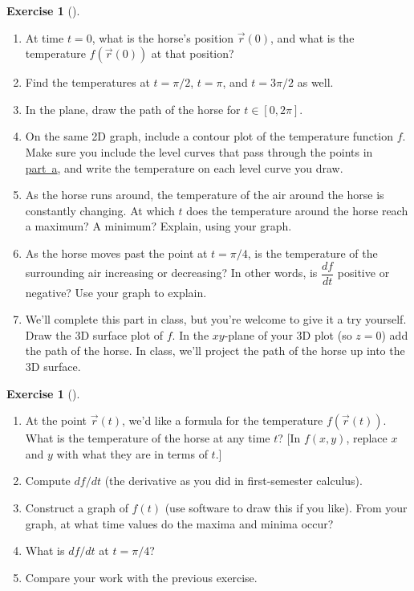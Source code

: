 \documentclass[10pt,]{book}
\theoremstyle{plain}
\theoremstyle{definition}
\theoremstyle{definition}
\theoremstyle{definition}
\theoremstyle{definition}
\newtheorem{exploration}[project]{Exercise}
\theoremstyle{definition}
\numberwithin{equation}{section}
\begin{document}
\begin{exploration}[]\label{prob_horse_track_chain}
\leavevmode%
\begin{enumerate}[font=\bfseries,label=(\alph*),ref=\alph*]
\item\label{item_1} At time \(t=0\), what is the horse's position \(\vec r(0)\), and what is the temperature \(f(\vec r(0))\) at that position?%
\item\label{task-342} Find the temperatures at \(t=\pi/2\), \(t=\pi\), and \(t=3\pi/2\) as well.%
\item\label{task-343} In the plane, draw the path of the horse for \(t\in [0,2\pi]\).%
\item\label{task-344} On the same 2D graph, include a contour plot of the temperature function \(f\). Make sure you include the level curves that pass through the points in \hyperref[item_1]{part~a}, and write the temperature on each level curve you draw. %
\item\label{task-345} As the horse runs around, the temperature of the air around the horse is constantly changing. At which \(t\) does the temperature around the horse reach a maximum?  A minimum?  Explain, using your graph. %
\item\label{item_2} As the horse moves past the point at \(t=\pi/4\), is the temperature of the surrounding air increasing or decreasing? In other words, is \(\dfrac{df}{dt}\) positive or negative? Use your graph to explain.%
\item\label{task-347} We'll complete this part in class, but you're welcome to give it a try yourself. Draw the 3D surface plot of \(f\). In the \(xy\)-plane of your 3D plot (so \(z=0\)) add the path of the horse. In class, we'll project the path of the horse up into the 3D surface.%
\end{enumerate}
\end{exploration}
\begin{exploration}[]\label{exploration-151}
\leavevmode%
\begin{enumerate}[font=\bfseries,label=(\alph*),ref=\alph*]
\item\label{task-348} At the point \(\vec r(t)\), we'd like a formula for the temperature \(f(\vec r(t))\). What is the temperature of the horse at any time \(t\)? [In \(f(x,y)\), replace \(x\) and \(y\) with what they are in terms of \(t\).]%
\item\label{task-349} Compute \(df/dt\) (the derivative as you did in first-semester calculus).%
\item\label{task-350} Construct a graph of \(f(t)\) (use software to draw this if you like). From your graph, at what time values do the maxima and minima occur?%
\item\label{task-351} What is \(df/dt\) at \(t=\pi/4\)?%
\item\label{task-352} Compare your work with the previous exercise.%
\end{enumerate}
\end{exploration}
\end{document}
